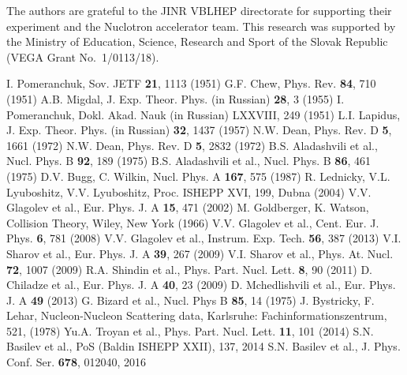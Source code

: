 \documentclass[twocolumn,epjc3]{svjour3}
\begin{document}
\begin{acknowledgements}
  The authors are grateful to the JINR VBLHEP directorate for supporting their
  experiment and the Nuclotron accelerator team. This research was supported by
  the Ministry of Education, Science, Research and Sport of the Slovak Republic
  (VEGA Grant No.~1/0113/18).
\end{acknowledgements}

\begin{thebibliography}{99}
  I. Pomeranchuk, Sov. JETF \textbf{21}, 1113 (1951)
  G.F. Chew, Phys. Rev. \textbf{84}, 710 (1951)
  A.B. Migdal, J. Exp. Theor. Phys. (in Russian) \textbf{28}, 3 (1955)
  I. Pomeranchuk, Dokl. Akad. Nauk (in Russian) LXXVIII, 249 (1951)
  L.I. Lapidus, J. Exp. Theor. Phys. (in Russian) \textbf{32}, 1437 (1957)
  N.W. Dean, Phys. Rev. D \textbf{5}, 1661 (1972)
  N.W. Dean, Phys. Rev. D \textbf{5}, 2832 (1972)
  B.S. Aladashvili et al., Nucl. Phys. B \textbf{92}, 189 (1975)
  B.S. Aladashvili et al., Nucl. Phys. B \textbf{86}, 461 (1975)
  D.V. Bugg, C. Wilkin, Nucl. Phys. A \textbf{167}, 575 (1987)
  R. Lednicky, V.L. Lyuboshitz, V.V. Lyuboshitz, Proc. ISHEPP XVI, 199,
  Dubna (2004)
  V.V. Glagolev et al., Eur. Phys. J. A \textbf{15}, 471 (2002)
  M. Goldberger, K. Watson, Collision Theory, Wiley, New York (1966)
  V.V. Glagolev et al., Cent. Eur. J. Phys. \textbf{6}, 781 (2008)
  V.V. Glagolev et al., Instrum. Exp. Tech. \textbf{56}, 387 (2013)
  V.I. Sharov et al., Eur. Phys. J. A \textbf{39}, 267 (2009)
  V.I. Sharov et al., Phys. At. Nucl. \textbf{72}, 1007 (2009)
  R.A. Shindin et al., Phys. Part. Nucl. Lett. \textbf{8}, 90 (2011)
  D. Chiladze et al., Eur. Phys. J. A \textbf{40}, 23 (2009)
  D. Mchedlishvili et al., Eur. Phys. J. A \textbf{49} (2013)
  G. Bizard et al., Nucl. Phys B \textbf{85}, 14 (1975)
  J. Bystricky, F. Lehar, Nucleon-Nucleon Scattering data, Karlsruhe:
  Fachinformationszentrum, 521, (1978)
  Yu.A. Troyan et al., Phys. Part. Nucl. Lett. \textbf{11}, 101 (2014)
  S.N. Basilev et al., PoS (Baldin ISHEPP XXII), 137, 2014
  S.N. Basilev et al., J. Phys. Conf. Ser. \textbf{678}, 012040, 2016
\end{thebibliography}
\end{document}
